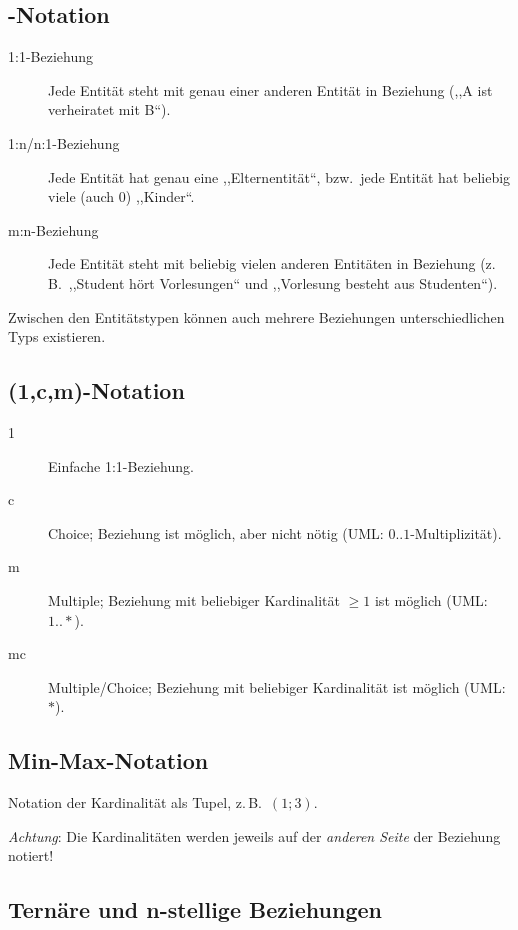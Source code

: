 \subsection{\protect{}-Notation}
\begin{description}
\item [{1:1-Beziehung}] Jede Entität steht mit genau einer anderen Entität
in Beziehung (,,A ist verheiratet mit B``).
\item [{1:n/n:1-Beziehung}] Jede Entität hat genau eine ,,Elternentität``,
bzw.~jede Entität hat beliebig viele (auch 0) ,,Kinder``.
\item [{m:n-Beziehung}] Jede Entität steht mit beliebig vielen anderen
Entitäten in Beziehung (z.\,B.~,,Student hört Vorlesungen`` und
,,Vorlesung besteht aus Studenten``).
\end{description}
Zwischen den Entitätstypen können auch mehrere Beziehungen unterschiedlichen
Typs existieren.



\subsection{(1,c,m)-Notation}
\begin{description}
\item [{1}] Einfache 1:1-Beziehung.
\item [{c}] Choice; Beziehung ist möglich, aber nicht nötig (UML: $0..1$-Multiplizität).
\item [{m}] Multiple; Beziehung mit beliebiger Kardinalität $\geq1$ ist
möglich (UML: $1..*$).
\item [{mc}] Multiple\slash{}Choice; Beziehung mit beliebiger Kardinalität
ist möglich (UML: $*$).
\end{description}



\subsection{Min-Max-Notation}

Notation der Kardinalität als Tupel, z.\,B.~$(1;3)$.

\emph{Achtung}: Die Kardinalitäten werden jeweils auf der \emph{anderen
Seite} der Beziehung notiert!



\subsection{Ternäre und n-stellige Beziehungen}

